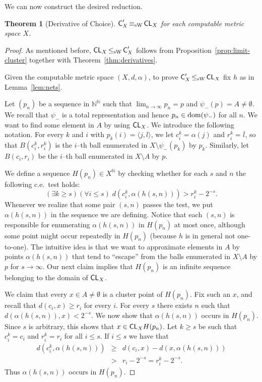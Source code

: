 \documentclass[a4paper]{amsart}
\def\dom{{\rm dom}}
\def\C{\mbox{\rm\sffamily C}}
\def\CL{\text{\rm\sffamily CL}}
\def\leqSW{\mathop{\leq_{\mathrm{sW}}}}
\def\equivSW{\mathop{\equiv_{\mathrm{sW}}}}
\newcommand{\bbN}{\mathbb{N}}
\newcommand{\Bai}{\ensuremath{{\bbN^\bbN}}}
\newtheorem{theorem}{Theorem}[section]
\theoremstyle{definition}
\begin{document}
We can now construct the desired reduction.

\begin{theorem}[Derivative of Choice]
\label{thm:derivative-closed-choice}
$\C_X'\equivSW\CL_X$ for each computable metric space $X$. 
\end{theorem}
\begin{proof}
As mentioned before, $\CL_X\leqSW\C_X'$ follows from Proposition~\ref{prop:limit-cluster} 
together with Theorem~\ref{thm:derivatives}.

Given the computable metric space $(X,d,\alpha)$, to prove $\C_X'\leqSW\CL_X$ fix $h$ as in Lemma~\ref{lem:nets}.

Let $(p_n)$ be a sequence in $\Bai$ such that $\lim_{n\to\infty} p_n= p$ and $\psi_- (p) = A \neq \emptyset$. 
We recall that $\psi_-$ is a total representation and hence $p_n\in\dom(\psi_-)$ for all $n$.
We want to find some element in $A$ by using $\CL_X$. We introduce the following notation.
For every $k$ and $i$ with $p_k (i) = \langle j,l \rangle$, we let
$c^k_i = \alpha(j)$ and $r^k_i =\overline{l}$, so that $B(c^k_i, r^k_i)$ is 
the $i$--th ball enumerated in $X \setminus \psi_-(p_k)$ by $p_k$.
Similarly, let $B(c_i, r_i)$ be the $i$--th ball enumerated in $X
\setminus A$ by $p$.

We define a sequence $H(p_n) \in X^\bbN$ by checking whether for each
$s$ and $n$ the following c.e.\ test holds:
\[
(\exists k \geq s)( \forall i \leq s)\; d(c^k_i, \alpha(h(s,n))) > r^k_i - 2^{-s}.
\]
Whenever we realize that some pair $(s,n)$ passes the test, we put
$\alpha(h(s,n))$ in the sequence we are defining. 
Notice that each $(s,n)$ is responsible for enumerating $\alpha(h(s,n))$ in $H(p_n)$ at most once,
although some point might occur repeatedly in $H(p_n)$ (because $h$ is in general not one-to-one).
The intuitive idea is that we want to approximate elements in $A$ by points $\alpha(h(s,n))$ that tend
to ``escape'' from the balls enumerated in $X\setminus A$ by $p$ for $s\to\infty$.
Our next claim
implies that $H(p_n)$ is an infinite sequence belonging to the domain
of $\CL_X$.

We claim that every $x \in A \neq \emptyset$ is a cluster point of
$H(p_n)$. Fix such an $x$, and recall that $d(c_i, x) \geq r_i$ for
every $i$. For every $s$ there exists $n$ such that
$d(\alpha(h(s,n)), x) < 2^{-s}$. We now show that $\alpha(h(s,n))$
occurs in $H(p_n)$. Since $s$ is arbitrary, this shows that $x \in
\CL_X H(p_n)$. Let $k \geq s$ be such that $c^k_i = c_i$ and $r^k_i =
r_i$ for all $i \leq s$. If $i \leq s$ we have that
\begin{eqnarray*}
d(c^k_i, \alpha(h(s,n))) & \geq& d(c_i, x) - d(x,\alpha(h(s,n)))\\
& > & r_i - 2^{-s} = r^k_i - 2^{-s}.
\end{eqnarray*}
Thus $\alpha(h(s,n))$ occurs in $H(p_n)$.


\end{proof}
\end{document}
